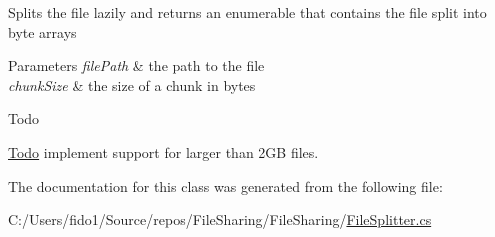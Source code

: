 Splits the file lazily and returns an enumerable that contains the file split into byte arrays 


\begin{DoxyParams}{Parameters}
{\em file\+Path} & the path to the file\\
\hline
{\em chunk\+Size} & the size of a chunk in bytes\\
\hline
\end{DoxyParams}


\begin{DoxyRefDesc}{Todo}
\item[\hyperlink{todo__todo000002}{Todo}]implement support for larger than 2\+GB files. \end{DoxyRefDesc}


The documentation for this class was generated from the following file\+:\begin{DoxyCompactItemize}
\item 
C\+:/\+Users/fido1/\+Source/repos/\+File\+Sharing/\+File\+Sharing/\hyperlink{_file_splitter_8cs}{File\+Splitter.\+cs}\end{DoxyCompactItemize}

